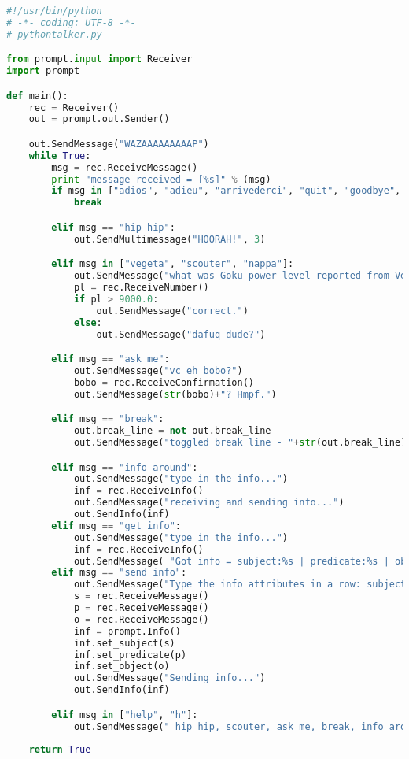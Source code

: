 \vspace{1em}
\begin{lstlisting}[language=python]
#!/usr/bin/python
# -*- coding: UTF-8 -*-    
# pythontalker.py

from prompt.input import Receiver
import prompt

def main():
    rec = Receiver()
    out = prompt.out.Sender()

    out.SendMessage("WAZAAAAAAAAAP")
    while True:
        msg = rec.ReceiveMessage()
        print "message received = [%s]" % (msg)
        if msg in ["adios", "adieu", "arrivederci", "quit", "goodbye", "flw", "falou", "te mais", "te", "bye", "hasta"]:
            break

        elif msg == "hip hip":
            out.SendMultimessage("HOORAH!", 3)

        elif msg in ["vegeta", "scouter", "nappa"]:
            out.SendMessage("what was Goku power level reported from Vegeta scouter?")
            pl = rec.ReceiveNumber()
            if pl > 9000.0:
                out.SendMessage("correct.")
            else:
                out.SendMessage("dafuq dude?")

        elif msg == "ask me":
            out.SendMessage("vc eh bobo?")
            bobo = rec.ReceiveConfirmation()
            out.SendMessage(str(bobo)+"? Hmpf.")

        elif msg == "break":
            out.break_line = not out.break_line
            out.SendMessage("toggled break line - "+str(out.break_line))

        elif msg == "info around":
            out.SendMessage("type in the info...")
            inf = rec.ReceiveInfo()
            out.SendMessage("receiving and sending info...")
            out.SendInfo(inf)
        elif msg == "get info":
            out.SendMessage("type in the info...")
            inf = rec.ReceiveInfo()
            out.SendMessage( "Got info = subject:%s | predicate:%s | object:%s "%(inf.subject(), inf.predicate(), inf.object()) )
        elif msg == "send info":
            out.SendMessage("Type the info attributes in a row: subject, predicate and object.")
            s = rec.ReceiveMessage()
            p = rec.ReceiveMessage()
            o = rec.ReceiveMessage()
            inf = prompt.Info()
            inf.set_subject(s)
            inf.set_predicate(p)
            inf.set_object(o)
            out.SendMessage("Sending info...")
            out.SendInfo(inf)

        elif msg in ["help", "h"]:
            out.SendMessage(" hip hip, scouter, ask me, break, info around, get info, send info, quit")
        
    return True
\end{lstlisting}

